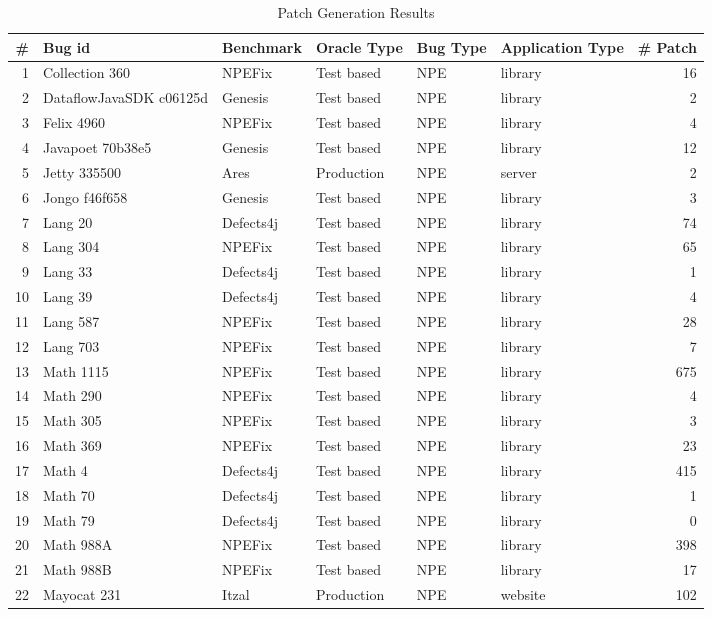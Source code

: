 \begin{table}
  \caption{Patch Generation Results}
  \label{tab:generation}
  \begin{tabular}{|r|l|l|l|l|l|r|}
    \hline
    \# & Bug id & Benchmark  & Oracle Type  & Bug Type  & Application Type & \# Patch \\
    \hline
    1 & Collection 360 & NPEFix & Test based & NPE & library & 16 \\
    2 & DataflowJavaSDK c06125d & Genesis & Test based & NPE & library & 2 \\
    3 & Felix 4960 & NPEFix & Test based & NPE & library & 4 \\
    4 & Javapoet 70b38e5 & Genesis & Test based & NPE & library & 12 \\
    5 & Jetty 335500 & Ares & Production & NPE & server & 2 \\
    6 & Jongo f46f658 & Genesis & Test based & NPE & library & 3 \\
    7 & Lang 20 & Defects4j & Test based & NPE & library & 74 \\
    8 & Lang 304 & NPEFix & Test based & NPE & library & 65 \\
    9 & Lang 33 & Defects4j & Test based & NPE & library & 1 \\
    10 & Lang 39 & Defects4j & Test based & NPE & library & 4 \\
    11 & Lang 587 & NPEFix & Test based & NPE & library & 28 \\
    12 & Lang 703 & NPEFix & Test based & NPE & library & 7 \\
    13 & Math 1115 & NPEFix & Test based & NPE & library & 675 \\
    14 & Math 290 & NPEFix & Test based & NPE & library & 4 \\
    15 & Math 305 & NPEFix & Test based & NPE & library & 3 \\
    16 & Math 369 & NPEFix & Test based & NPE & library & 23 \\
    17 & Math 4 & Defects4j & Test based & NPE & library & 415 \\
    18 & Math 70 & Defects4j & Test based & NPE & library & 1 \\
    19 & Math 79 & Defects4j & Test based & NPE & library & 0 \\
    20 & Math 988A & NPEFix & Test based & NPE & library & 398 \\
    21 & Math 988B & NPEFix & Test based & NPE & library & 17 \\
    22 & Mayocat 231 & Itzal & Production & NPE & website & 102 \\

\end{tabular}
\end{table}
